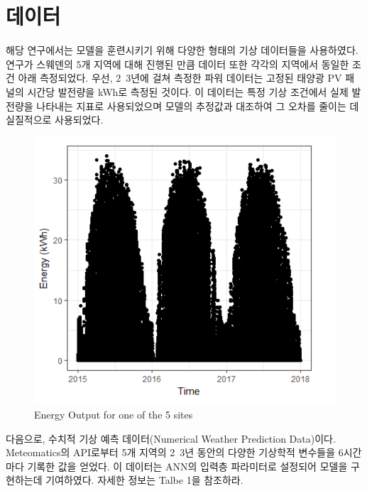 \documentclass{article}
\begin{document}
\section{데이터}
해당 연구에서는 모델을 훈련시키기 위해 다양한 형태의 기상 데이터들을 사용하였다. 연구가 스웨덴의 5개 지역에 대해 진행된 만큼 데이터 또한 각각의 지역에서 동일한 조건 아래 측정되었다. 우선, 2~3년에 걸쳐 측정한 파워 데이터는 고정된 태양광 PV 패널의 시간당 발전량을 kWh로 측정된 것이다. 이 데이터는 특정 기상 조건에서 실제 발전량을 나타내는 지표로 사용되었으며 모델의 추정값과 대조하여 그 오차를 줄이는 데 실질적으로 사용되었다.

\begin{figure}[h]
\centering
\includegraphics[scale=0.20]{./fig/Figure_4.png}
\caption{Energy Output for one of the 5 sites}
\label{fig_2}
\end{figure}

다음으로, 수치적 기상 예측 데이터(Numerical Weather Prediction Data)이다. Meteomatics의 API로부터 5개 지역의 2~3년 동안의 다양한 기상학적 변수들을 6시간마다 기록한 값을 얻었다. 이 데이터는 ANN의 입력층 파라미터로 설정되어 모델을 구현하는데 기여하였다. 자세한 정보는 Talbe 1을 참조하라.
\end{document}
